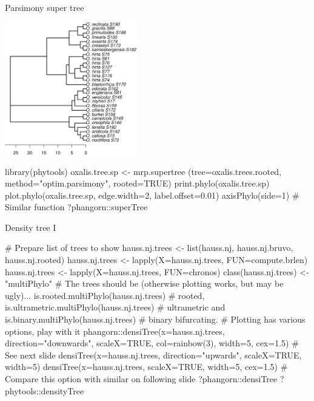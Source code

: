 \documentclass[compress, ucs, xelatex, 11pt, xcolor=svgnames,
  hyperref={
    bookmarks=true,
    unicode=true,
    colorlinks=true,
    pdftitle={Molecular data in R},
    plainpages=false,
    pdfauthor={Vojtech Zeisek},
    pdfsubject={Course about phylogeny and evolution in R},
    pdfcreator={XeLaTeX},
    pdfkeywords={R, evolution, phylogeny, molecular data},
    linkcolor=Tomato,
    anchorcolor=SaddleBrown,
    citecolor=Goldenrod,
    filecolor=DarkMagenta,
    menucolor=Sienna,
    urlcolor=DarkTurquoise,
    pdftex},
  url={hyphens, lowtilde} %
  ]{beamer}
\begin{document}
\begin{frame}[fragile]{Parsimony super tree}
\begin{multicols}{2}
  \begin{center}
    \includegraphics[height=5.75cm]{oxalis-pars.png}
  \end{center}
  \begin{spluscode}
    library(phytools)
    oxalis.tree.sp <- mrp.supertree
      (tree=oxalis.trees.rooted,
      method="optim.parsimony",
      rooted=TRUE)
    print.phylo(oxalis.tree.sp)
    plot.phylo(oxalis.tree.sp,
      edge.width=2, label.offset=0.01)
    axisPhylo(side=1)
    # Similar function
    ?phangorn::superTree
  \end{spluscode}
\end{multicols}
\end{frame}

\begin{frame}[fragile]{Density tree I}
  \begin{spluscode}
    # Prepare list of trees to show
    hauss.nj.trees <- list(hauss.nj, hauss.nj.bruvo, hauss.nj.rooted)
    hauss.nj.trees <- lapply(X=hauss.nj.trees, FUN=compute.brlen)
    hauss.nj.trees <- lapply(X=hauss.nj.trees, FUN=chronos)
    class(hauss.nj.trees) <- "multiPhylo"
    # The trees should be (otherwise plotting works, but may be ugly)...
    is.rooted.multiPhylo(hauss.nj.trees) # rooted,
    is.ultrametric.multiPhylo(hauss.nj.trees) # ultrametric and
    is.binary.multiPhylo(hauss.nj.trees) # binary bifurcating.
    # Plotting has various options, play with it
    phangorn::densiTree(x=hauss.nj.trees, direction="downwards",
      scaleX=TRUE, col=rainbow(3), width=5, cex=1.5) # See next slide
    densiTree(x=hauss.nj.trees, direction="upwards", scaleX=TRUE, width=5)
    densiTree(x=hauss.nj.trees, scaleX=TRUE, width=5, cex=1.5)
    # Compare this option with similar on following slide
    ?phangorn::densiTree
    ?phytools::densityTree
  \end{spluscode}
\end{frame}
\end{document}
